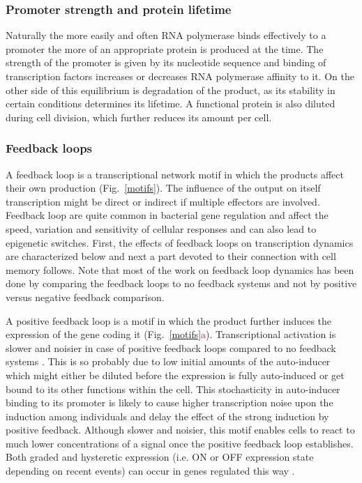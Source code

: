 \subsubsection{Promoter strength and protein lifetime}
Naturally the more easily and often RNA polymerase binds effectively to a promoter the more of an appropriate protein is produced at the time.
The strength of the promoter is given by its nucleotide sequence and binding of transcription factors increases or decreases RNA polymerase affinity to it.
On the other side of this equilibrium is degradation of the product, as its stability in certain conditions determines its lifetime.
A functional protein is also diluted during cell division, which further reduces its amount per cell.

\subsubsection{Feedback loops}
A feedback loop is a transcriptional network motif in which the products affect their own production (Fig.~\ref{motifs}).
The influence of the output on itself transcription might be direct or indirect if multiple effectors are involved.
Feedback loop are quite common in bacterial gene regulation and affect the speed, variation and sensitivity of cellular responses and can also lead to epigenetic switches.
First, the effects of feedback loops on transcription dynamics are characterized below and next a part devoted to their connection with cell memory follows.
Note that most of the work on feedback loop dynamics has been done by comparing the feedback loops to no feedback systems and not by positive versus negative feedback comparison.

A positive feedback loop is a motif in which the product further induces the expression of the gene coding it (Fig.~\ref{motifs}\textcolor{red}{a}).
Transcriptional activation is slower and noisier in case of positive feedback loops compared to no feedback systems \cite{maeda2006regulatory, sayut2007noise}.
This is so probably due to low initial amounts of the auto-inducer which might either be diluted before the expression is fully auto-induced or get bound to its other functions within the cell.
This stochasticity in auto-inducer binding to its promoter is likely to cause higher transcription noise upon the induction among individuals and delay the effect of the strong induction by positive feedback.
Although slower and noisier, this motif enables cells to react to much lower concentrations of a signal once the positive feedback loop establishes.
Both graded and hysteretic expression (i.e. ON or OFF expression state depending on recent events) can occur in genes regulated this way \cite{maeda2006regulatory}.

